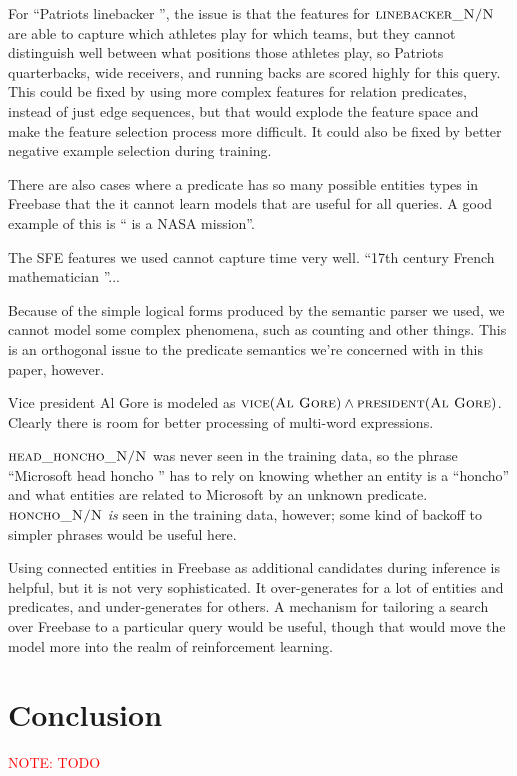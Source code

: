 \documentclass[11pt]{article}
\newcommand{\mattnote}[1]{\textcolor{red}{NOTE: #1}}
\newcommand{\blank}{\underline{\hspace{.5cm}}}
\newcommand{\predicate}[1]{\ensuremath{\textsc{#1}}}
\newcommand{\entity}[1]{\ensuremath{\textsc{#1}}}
\begin{document}
For ``Patriots linebacker \blank{}'', the issue is that the features for
\predicate{linebacker\_N/N} are able to capture which athletes play for which
teams, but they cannot distinguish well between what positions those athletes
play, so Patriots quarterbacks, wide receivers, and running backs are scored
highly for this query.  This could be fixed by using more complex features for
relation predicates, instead of just edge sequences, but that would explode the
feature space and make the feature selection process more difficult.  It could
also be fixed by better negative example selection during training.

There are also cases where a predicate has so many possible entities types in
Freebase that the it cannot learn models that are useful for all queries.  A
good example of this is ``\blank{} is a NASA mission''.

The SFE features we used cannot capture time very well.  ``17th century French
mathematician \blank{}''...

Because of the simple logical forms produced by the semantic parser we used, we
cannot model some complex phenomena, such as counting and other things.  This
is an orthogonal issue to the predicate semantics we're concerned with in this
paper, however.

Vice president Al Gore is modeled as $\predicate{vice}(\entity{Al Gore}) \land
\predicate{president}(\entity{Al Gore})$.  Clearly there is room for better
processing of multi-word expressions.

\predicate{head\_honcho\_N/N} was never seen in the training data, so the
phrase ``Microsoft head honcho \blank{}'' has to rely on knowing whether an
entity is a ``honcho'' and what entities are related to Microsoft by an unknown
predicate.  \predicate{honcho\_N/N} \emph{is} seen in the training data,
however; some kind of backoff to simpler phrases would be useful here.

Using connected entities in Freebase as additional candidates during inference
is helpful, but it is not very sophisticated.  It over-generates for a lot of
entities and predicates, and under-generates for others.  A mechanism for
tailoring a search over Freebase to a particular query would be useful, though
that would move the model more into the realm of reinforcement learning.

\section{Conclusion}
\label{sec:conclusion}

\mattnote{TODO}




\end{document}
